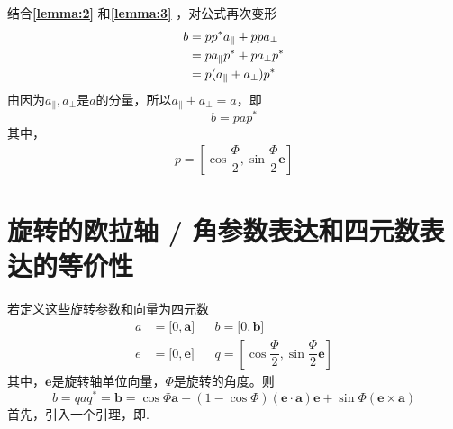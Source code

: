 结合\textbf{\ref{lemma:2}} 和\textbf{\ref{lemma:3}} ，对公式再次变形
\begin{align}
	b & = pp^* a_\parallel + pp a_\perp \notag\\
	&= p a_\parallel p^* + p a_\perp p^* \\
	&= p(a_\parallel + a_\perp)p^*
\end{align}
由因为$a_\parallel, a_\perp$是$a$的分量，所以$a_\parallel + a_\perp = a$，即
\begin{equation}
	b = p a p^*
\end{equation}
其中，
\begin{align}
	p = \left[ \cos \dfrac{\varPhi}{2}, \sin \dfrac{\varPhi}{2} \bm{e} \right]
\end{align}
\vspace*{-1em}



\section{旋转的欧拉轴 / 角参数表达和四元数表达的等价性}
\label{旋转的欧拉轴 / 角参数表达和四元数表达的等价性}
若定义这些旋转参数和向量为四元数
\begin{align*}
	a &= \big[ 0, \bm{a} \big]  && b = \big[ 0, \bm{b} \big] \\
	e &= \big[0, \bm{e} \big] && q = \left[ \cos \dfrac{\varPhi}{2}, \sin \dfrac{\varPhi}{2} \bm{e} \right]
\end{align*}
其中，$\bm{e}$是旋转轴单位向量，$\varPhi$是旋转的角度。则
\begin{equation}
	b = q a q^* = \bm{b} = \cos \varPhi \bm{a} + ( 1 - \cos \varPhi ) (\bm{e} \cdot \bm{a})\bm{e} + \sin \varPhi(\bm{e} \times \bm{a})
\end{equation}
\proof 首先，引入一个引理，即.

